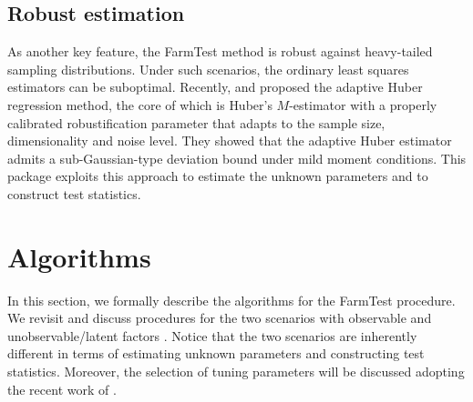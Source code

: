 



\subsection{Robust estimation}



As another key feature, the FarmTest method is robust against heavy-tailed sampling distributions. Under such scenarios, the ordinary least squares estimators can be suboptimal.
Recently, \cite{FLW2017} and \cite{SZF2020} proposed the adaptive Huber regression method, the core of which is Huber's $M$-estimator \citep{huber1} with a properly calibrated robustification parameter that adapts to the sample size, dimensionality and noise level. They showed that the adaptive Huber estimator admits a sub-Gaussian-type deviation bound under mild moment conditions.
This package exploits this approach to estimate the unknown parameters and to construct test statistics.  

 




\section[Algorithms]{Algorithms}\label{sec:algorithm}
In this section, we formally describe the algorithms for the FarmTest procedure.
We revisit and discuss procedures for the two scenarios with observable and unobservable/latent factors \citep{ZBFL2017, FKSZ2017}. Notice that the two scenarios are inherently different in terms of estimating unknown parameters and constructing test statistics.
Moreover, the selection of tuning parameters will be discussed adopting the recent work of \cite{KMRSZ2019}.



